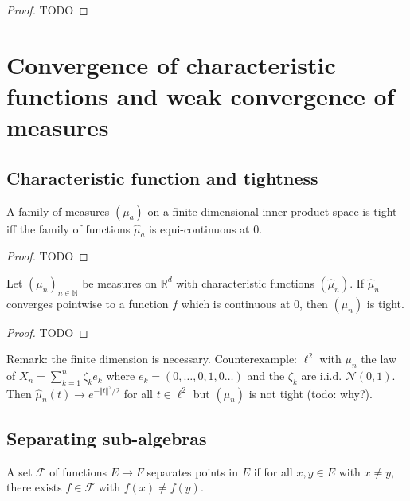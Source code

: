 \begin{proof}
TODO
\end{proof}

\section{Convergence of characteristic functions and weak convergence of measures}

\subsection{Characteristic function and tightness}

\begin{lemma}\label{lem:tight_iff_charFun_equiContinuous}
A family of measures $(\mu_a)$ on a finite dimensional inner product space is tight iff the family of functions $\hat{\mu}_a$ is equi-continuous at 0.
\end{lemma}

\begin{proof}
TODO
\end{proof}

\begin{lemma}\label{lem:tight_of_tendsto_charFun}
Let $(\mu_n)_{n \in \mathbb{N}}$ be measures on $\mathbb{R}^d$ with characteristic functions $(\hat{\mu}_n)$. If $\hat{\mu}_n$ converges pointwise to a function $f$ which is continuous at 0, then $(\mu_n)$ is tight.
\end{lemma}

\begin{proof}
TODO
\end{proof}

Remark: the finite dimension is necessary. Counterexample: $\ell^2$ with $\mu_n$ the law of $X_n = \sum_{k=1}^n \zeta_k e_k$ where $e_k = (0, \ldots, 0, 1, 0 \ldots)$ and the $\zeta_k$ are i.i.d. $\mathcal N(0,1)$. Then $\hat{\mu}_n(t) \to e^{- \Vert t \Vert^2 / 2}$ for all $t \in \ell^2$ but $(\mu_n)$ is not tight (todo: why?).

\subsection{Separating sub-algebras}

\begin{definition}\label{def:separates_points}
 \leanok
A set $\mathcal F$ of functions $E \to F$ separates points in $E$ if for all $x, y \in E$ with $x \ne y$, there exists $f \in \mathcal F$ with $f(x) \ne f(y)$.
\end{definition}

